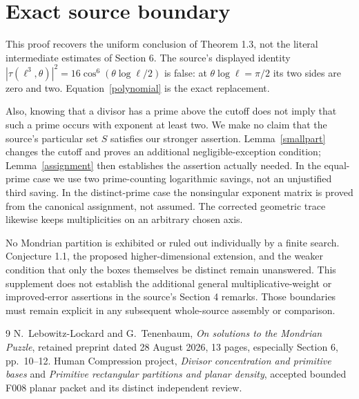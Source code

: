 \documentclass[11pt,a4paper]{article}
\begin{document}
\section{Exact source boundary}
This proof recovers the uniform conclusion of Theorem 1.3, not the
literal intermediate estimates of Section 6. The source's displayed
identity $|\tau(\ell^3,\theta)|^2=16\cos^6(\theta\log\ell/2)$
is false: at $\theta\log\ell=\pi/2$ its two sides are zero and two.
Equation~\eqref{polynomial} is the exact replacement.

Also, knowing that a divisor has a prime above the cutoff does not imply
that such a prime occurs with exponent at least two. We make no claim
that the source's particular set $S$ satisfies our stronger assertion.
Lemma~\ref{smallpart} changes the cutoff and proves an additional
negligible-exception condition; Lemma~\ref{assignment} then establishes
the assertion actually needed. In the equal-prime case we use two
prime-counting logarithmic savings, not an unjustified third saving.
In the distinct-prime case the nonsingular exponent matrix is proved
from the canonical assignment, not assumed. The corrected geometric
trace likewise keeps multiplicities on an arbitrary chosen axis.

No Mondrian partition is exhibited or ruled out individually by a
finite search. Conjecture 1.1, the proposed higher-dimensional extension,
and the weaker condition that only the boxes themselves be distinct
remain unanswered. This supplement does not establish the additional
general multiplicative-weight or improved-error assertions in the
source's Section 4 remarks. Those boundaries must remain explicit in
any subsequent whole-source assembly or comparison.

\begin{thebibliography}{9}
 N.~Lebowitz-Lockard and G.~Tenenbaum,
\emph{On solutions to the Mondrian Puzzle}, retained preprint dated
28 August 2026, 13 pages, especially Section 6, pp.~10--12.
 Human Compression project,
\emph{Divisor concentration and primitive bases} and
\emph{Primitive rectangular partitions and planar density},
accepted bounded F008 planar packet and its distinct independent review.
\end{thebibliography}
\end{document}
